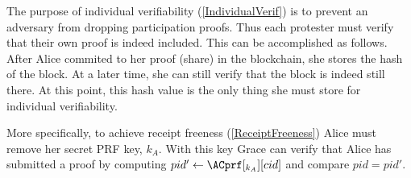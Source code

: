 The purpose of individual verifiability (\cref{IndividualVerif}) is to prevent 
an adversary from dropping participation proofs.
Thus each protester must verify that their own proof is indeed included.
This can be accomplished as follows.
After Alice commited to her proof (share) in the blockchain, she stores the hash 
of the block.
At a later time, she can still verify that the block is indeed still there.
At this point, this hash value is the only thing she must store for individual 
verifiability.

More specifically, to achieve receipt freeness (\cref{ReceiptFreeness}) Alice 
must remove her secret \ac{PRF} key, \(k_A\).
With this key Grace can verify that Alice has submitted a proof by computing 
\(pid'\gets \ACprf[_{k_A}][cid]\) and compare \(pid = pid'\).

